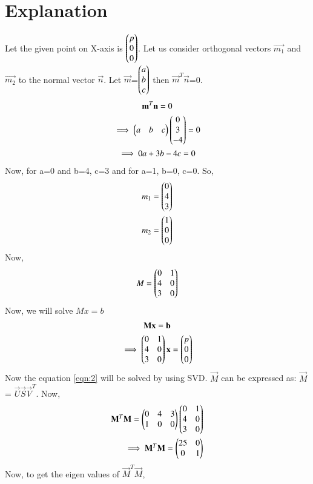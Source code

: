 \documentclass[journal,12pt,twocolumn]{IEEEtran}
\begin{document}
\section{Explanation}
Let the given point on X-axis is $\begin{pmatrix}p\\0\\0\end{pmatrix}$. Let us consider orthogonal vectors $\vec{m_1}$ and $\vec{m_2}$ to the normal vector $\vec{n}$.
Let $\vec{m}$=$\begin{pmatrix}a\\b\\c\end{pmatrix}$ then $\vec{m}^T \vec{n}$=0.
\begin{multline}
\mathbf{m}^T \mathbf{n} = 0\\
\implies \begin{pmatrix}a&b&c\end{pmatrix} \begin{pmatrix}0\\3\\-4\end{pmatrix} = 0\\
\implies 0 a + 3b -4c = 0
\end{multline}
Now, for a=0 and b=4, c=3 and for a=1, b=0, c=0. So,
\begin{align}
m_1 = \begin{pmatrix}0\\4\\3\end{pmatrix}\\
m_2 = \begin{pmatrix}1\\0\\0\end{pmatrix}
\end{align}
Now,
\begin{align}
M = \begin{pmatrix}0 & 1\\4 & 0\\3 & 0\end{pmatrix}
\end{align}
Now, we will solve $Mx=b$
\begin{multline}
\mathbf{M}\mathbf{x}=\mathbf{b}\\
\implies \begin{pmatrix}0 & 1\\4 & 0\\3 & 0\end{pmatrix}\mathbf{x}= \begin{pmatrix}p\\0\\0\end{pmatrix}
\label{eqn:2}
\end{multline}
Now the equation \ref{eqn:2} will be solved by using SVD.
$\vec{M}$ can be expressed as: $\vec{M}$ = $\vec{U} \vec{S} \vec{V}^T$.
Now, 
\begin{align}
\mathbf{M}^T \mathbf{M} = \begin{pmatrix}0& 4& 3\\1 & 0 & 0\end{pmatrix} \begin{pmatrix}0 & 1\\4 & 0\\3 & 0\end{pmatrix}\\
\implies \mathbf{M}^T \mathbf{M} = \begin{pmatrix}25 & 0\\0 & 1\end{pmatrix}
\end{align}
Now, to get the eigen values of $\vec{M}^T \vec{M}$,
\end{document}

